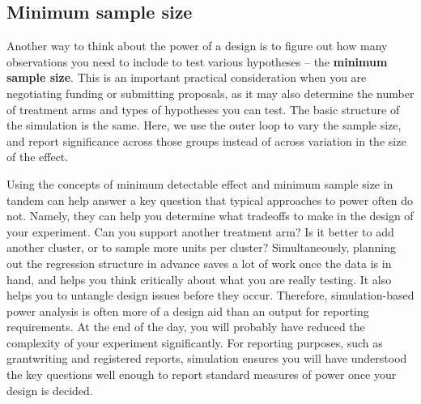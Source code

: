 

\subsection{Minimum sample size}

Another way to think about the power of a design
is to figure out how many observations you need to include
to test various hypotheses -- the \textbf{minimum sample size}.
This is an important practical consideration
when you are negotiating funding or submitting proposals,
as it may also determine the number of treatment arms
and types of hypotheses you can test.
The basic structure of the simulation is the same.
Here, we use the outer loop to vary the sample size,
and report significance across those groups
instead of across variation in the size of the effect.



Using the concepts of minimum detectable effect
and minimum sample size in tandem can help answer a key question
that typical approaches to power often do not.
Namely, they can help you determine what tradeoffs to make
in the design of your experiment.
Can you support another treatment arm?
Is it better to add another cluster,
or to sample more units per cluster?
Simultaneously, planning out the regression structure
in advance saves a lot of work once the data is in hand,
and helps you think critically about what you are really testing.
It also helps you to untangle design issues before they occur.
Therefore, simulation-based power analysis is often more of a design aid
than an output for reporting requirements.
At the end of the day, you will probably have reduced
the complexity of your experiment significantly.
For reporting purposes, such as grantwriting and registered reports,
simulation ensures you will have understood the key questions well enough
to report standard measures of power once your design is decided.

